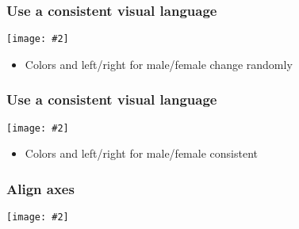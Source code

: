 \documentclass{beamer}
\newcommand{\bi}{\begin{itemize}}
\newcommand{\li}{\item}
\newcommand{\ei}{\end{itemize}}
\newcommand{\fig}[2]{\centerline{\texttt{[image: \#2]}}}
\newcommand{\bfr}[1]{\begin{frame}[fragile]\frametitle{{ #1 }}}
\begin{document}
\bfr{Use a consistent visual language}
\fig{.9}{athletes-composite-inconsistent-1.png}
\scriptsize
\bi\li Colors and left/right for male/female change randomly \ei
\end{frame}


\bfr{Use a consistent visual language}
\fig{.9}{athletes-composite-good-1.png}
\scriptsize
\bi\li Colors and left/right for male/female consistent \ei
\end{frame}


\bfr{Align axes}
\fig{.9}{athletes-composite-misaligned-1.png}

\end{frame}
\end{document}

